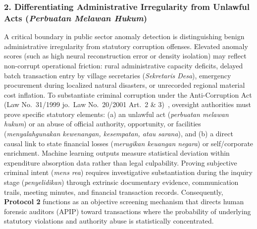 \documentclass[runningheads]{llncs}
\begin{document}
\subsubsection{2. Differentiating Administrative Irregularity from Unlawful Acts (\textit{Perbuatan Melawan Hukum})}
A critical boundary in public sector anomaly detection is distinguishing benign administrative irregularity from statutory corruption offenses. Elevated anomaly scores (such as high neural reconstruction error or density isolation) may reflect non-corrupt operational friction: rural administrative capacity deficits, delayed batch transaction entry by village secretaries (\textit{Sekretaris Desa}), emergency procurement during localized natural disasters, or unrecorded regional material cost inflation. To substantiate criminal corruption under the Anti-Corruption Act (Law No.\ 31/1999 jo.\ Law No.\ 20/2001 Art.\ 2 \& 3)~\cite{ref34}, oversight authorities must prove specific statutory elements: (a) an unlawful act (\textit{perbuatan melawan hukum}) or an abuse of official authority, opportunity, or facilities (\textit{menyalahgunakan kewenangan, kesempatan, atau sarana}), and (b) a direct causal link to state financial losses (\textit{merugikan keuangan negara}) or self/corporate enrichment. Machine learning outputs measure statistical deviation within expenditure absorption data rather than legal culpability. Proving subjective criminal intent (\textit{mens rea}) requires investigative substantiation during the inquiry stage (\textit{penyelidikan}) through extrinsic documentary evidence, communication trails, meeting minutes, and financial transaction records. Consequently, \textbf{Protocol 2} functions as an objective screening mechanism that directs human forensic auditors (APIP) toward transactions where the probability of underlying statutory violations and authority abuse is statistically concentrated.
\end{document}
